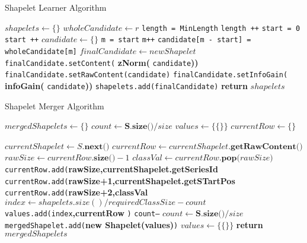 \documentclass{article}
\begin{document}
\begin{algorithm}
\caption{Shapelet Learner Algorithm}\label{shapeletLearner}
\begin{algorithmic}[1]
\State $shapelets \gets \{\}$
	\State $wholeCandidate \gets r$
	\State \texttt{length = MinLength}
		\State \texttt{length ++}
		\State \texttt{start = 0}
            		\State \texttt{start ++}
            		\State $candidate \gets \{\}$
           			\State \texttt{m = start}
                		\State \texttt{m++}
                		\State \texttt{candidate[m - start] = wholeCandidate[m]}
                	\EndWhile
                	\State $finalCandidate \gets newShapelet$
                	\State \texttt{finalCandidate.setContent(} \textbf{zNorm(} \texttt{candidate}\textbf{))}
                	\State \texttt{finalCandidate.setRawContent(candidate)}
                	\State \texttt{finalCandidate.setInfoGain(} \textbf{infoGain(} \texttt{candidate}\textbf{))}
                	\State \texttt{shapelets.add(finalCandidate)}
            	\EndWhile
      \EndWhile
\EndFor
\State \textbf{return} $shapelets$
\EndProcedure
\end{algorithmic}
\end{algorithm}

\begin{algorithm}
\caption{Shapelet Merger Algorithm}\label{shapeletMerger}
\begin{algorithmic}[1]
\State $mergedShapelets \gets \{\}$
\State $count \gets \textbf{S.size()}/size$
\State $values \gets \{\{\}\}$    
\State $currentRow \gets \{\}$
      
     \State $currentShapelet \gets S.\textbf{next()}$
     \State $currentRow \gets currentShapelet.\textbf{getRawContent()}$
     \State $rawSize \gets currentRow.\textbf{size()}-1$
     \State $classVal \gets currentRow.\textbf{pop(}rawSize\textbf{})$
     \State \texttt{currentRow.add(}\textbf{rawSize,currentShapelet.getSeriesId}
     \State \texttt{currentRow.add(}\textbf{rawSize+1,currentShapelet.getSTartPos}
     \State \texttt{currentRow.add(}\textbf{rawSize+2,classVal}
     \State $index \gets shapelets.size()/requiredClassSize - count$
     \State \texttt{values.add(index}\textbf{,currentRow} \texttt{)}
     \State \texttt{count--}   
     \Else
     	\State $count \gets \textbf{S.size()}/size$
     	\State \texttt{mergedShapelet.add(}\textbf{new Shapelet(values)}\texttt{)}
     	\State $values \gets \{\{\}\}$ 
     \EndIf
\EndWhile
\State \textbf{return} $mergedShapelets$
\EndProcedure
\end{algorithmic}
\end{algorithm}
\end{document}
